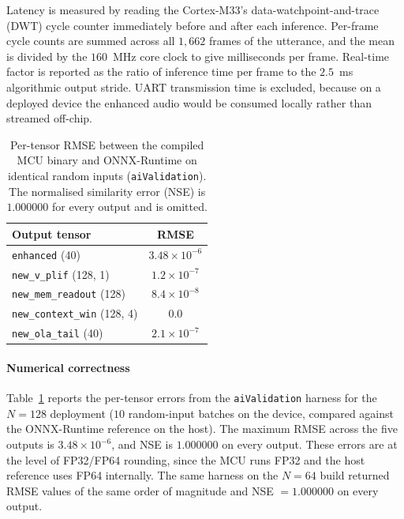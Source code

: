 \documentclass[conference]{IEEEtran}
\begin{document}
Latency is measured by reading the Cortex-M33's data-watchpoint-and-trace (DWT) cycle counter immediately before and after each inference. Per-frame cycle counts are summed across all $1{,}662$ frames of the utterance, and the mean is divided by the $160$~MHz core clock to give milliseconds per frame. Real-time factor is reported as the ratio of inference time per frame to the $2.5$~ms algorithmic output stride. UART transmission time is excluded, because on a deployed device the enhanced audio would be consumed locally rather than streamed off-chip.

\begin{table}[!ht]
\caption{Per-tensor RMSE between the compiled MCU binary and ONNX-Runtime on identical random inputs (\texttt{aiValidation}). The normalised similarity error (NSE) is $1.000000$ for every output and is omitted.}
\label{tab:numerical}
\centering
\begin{tabular}{lc}
\hline
\textbf{Output tensor} & \textbf{RMSE} \\
\hline
\texttt{enhanced} (40)              & $3.48 \times 10^{-6}$ \\
\texttt{new\_v\_plif} (128, 1)      & $1.2 \times 10^{-7}$  \\
\texttt{new\_mem\_readout} (128)    & $8.4 \times 10^{-8}$  \\
\texttt{new\_context\_win} (128, 4) & $0.0$                 \\
\texttt{new\_ola\_tail} (40)        & $2.1 \times 10^{-7}$  \\
\hline
\end{tabular}
\end{table}

\paragraph{Numerical correctness} Table~\ref{tab:numerical} reports the per-tensor errors from the \texttt{aiValidation} harness for the $N=128$ deployment ($10$ random-input batches on the device, compared against the ONNX-Runtime reference on the host). The maximum RMSE across the five outputs is $3.48 \times 10^{-6}$, and NSE is $1.000000$ on every output. These errors are at the level of FP32/FP64 rounding, since the MCU runs FP32 and the host reference uses FP64 internally. The same harness on the $N=64$ build returned RMSE values of the same order of magnitude and NSE $= 1.000000$ on every output.

\end{document}

